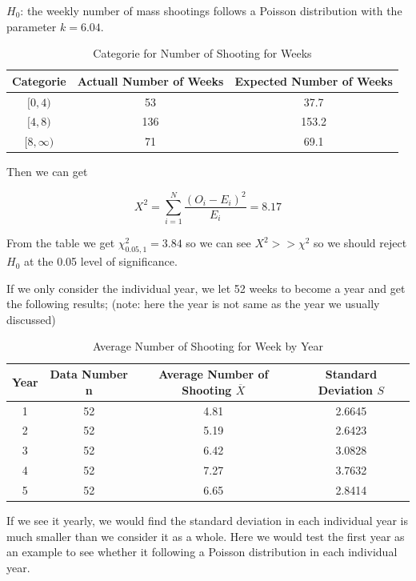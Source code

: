 \documentclass[12pt]{article}
\begin{document}
$H_0$: the weekly number of mass shootings follows a Poisson distribution with the parameter $k=6.04$.

\begin{table} [!htbp]
\begin{center}
\begin{tabular*} {14cm} {@{\extracolsep{\fill} }ccc}
\toprule
Categorie &Actuall Number of Weeks& Expected Number of Weeks\\
\midrule
$[0,4)$ & 53	& 37.7\\ \hline
$[4,8)$ & 136	& 153.2\\ \hline
$[8,\infty)$ & 71	& 69.1\\
\bottomrule
\end{tabular*}
\end{center}
\caption{Categorie for Number of Shooting for Weeks}
\end{table}

Then we can get

$$X^2=\sum_{i=1}^{N}\frac{(O_i-E_i)^2}{E_i}=8.17$$


From the table we get $\chi^2_{0.05,1}=3.84$ so we can see $X^2>>\chi^2$ so we should  reject $H_0$ at the 0.05 level of significance.

If we only consider the individual year, we let 52 weeks to become a year and get the following results; (note: here the year is not same as the year we usually discussed)


\begin{table} [!htbp]
\begin{center}
\begin{tabular*} {14cm} {@{\extracolsep{\fill} }cccc}
\toprule
Year & Data Number n &Average Number of Shooting $\overline X$ & Standard Deviation $S$\\
\midrule
1	&	52 & 4.81	& 2.6645\\ \hline
2	&	52   &	5.19 & 2.6423\\ \hline
3	&	52 & 6.42	& 3.0828\\ \hline
4	&	52   &	7.27  & 3.7632\\ \hline
5	&	52 & 6.65	& 2.8414\\
\bottomrule
\end{tabular*}
\end{center}
\caption{Average Number of Shooting for  Week  by Year}
\end{table}



If we see it yearly, we would find the standard deviation in each individual year is much smaller than we consider it as a whole. Here we would test the first year as an example to see whether it following a Poisson distribution in each individual year.
\end{document}
